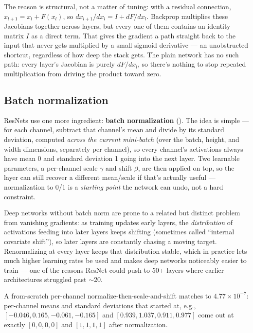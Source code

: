The reason is structural, not a matter of tuning: with a residual connection, $x_{l+1}=x_l+F(x_l)$, so $dx_{l+1}/dx_l=I+dF/dx_l$. Backprop multiplies these Jacobians together across layers, but every one of them contains an identity matrix $I$ as a direct term. That gives the gradient a path straight back to the input that never gets multiplied by a small sigmoid derivative --- an unobstructed shortcut, regardless of how deep the stack gets. The plain network has no such path: every layer's Jacobian is purely $dF/dx_l$, so there's nothing to stop repeated multiplication from driving the product toward zero.

\subsection*{Batch normalization}

ResNets use one more ingredient: \textbf{batch normalization} (). The idea is simple --- for each channel, subtract that channel's mean and divide by its standard deviation, computed \emph{across the current mini-batch} (over the batch, height, and width dimensions, separately per channel), so every channel's activations always have mean 0 and standard deviation 1 going into the next layer. Two learnable parameters, a per-channel scale $\gamma$ and shift $\beta$, are then applied on top, so the layer can still recover a different mean/scale if that's actually useful --- normalization to 0/1 is a \emph{starting point} the network can undo, not a hard constraint.

Deep networks without batch norm are prone to a related but distinct problem from vanishing gradients: as training updates early layers, the \emph{distribution} of activations feeding into later layers keeps shifting (sometimes called ``internal covariate shift''), so later layers are constantly chasing a moving target. Renormalizing at every layer keeps that distribution stable, which in practice lets much higher learning rates be used and makes deep networks noticeably easier to train --- one of the reasons ResNet could push to 50+ layers where earlier architectures struggled past $\sim$20.

A from-scratch per-channel normalize-then-scale-and-shift matches  to $4.77\times10^{-7}$: per-channel means and standard deviations that started at, e.g., $[-0.046, 0.165, -0.061, -0.165]$ and $[0.939, 1.037, 0.911, 0.977]$ come out at exactly $[0,0,0,0]$ and $[1,1,1,1]$ after normalization.

